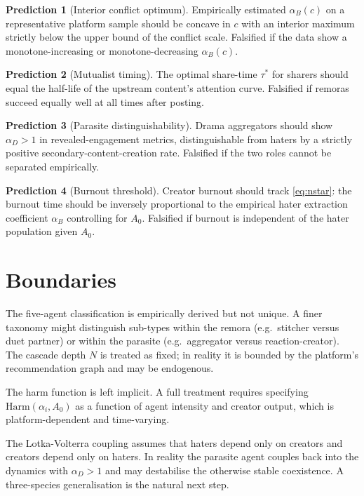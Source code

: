 \documentclass[12pt,a4paper]{article}
\begin{document}
\textbf{Prediction 1} (Interior conflict optimum). Empirically estimated $\alpha_B(c)$ on a representative platform sample should be concave in $c$ with an interior maximum strictly below the upper bound of the conflict scale. Falsified if the data show a monotone-increasing or monotone-decreasing $\alpha_B(c)$.

\textbf{Prediction 2} (Mutualist timing). The optimal share-time $\tau^{*}$ for sharers should equal the half-life of the upstream content's attention curve. Falsified if remoras succeed equally well at all times after posting.

\textbf{Prediction 3} (Parasite distinguishability). Drama aggregators should show $\alpha_D > 1$ in revealed-engagement metrics, distinguishable from haters by a strictly positive secondary-content-creation rate. Falsified if the two roles cannot be separated empirically.

\textbf{Prediction 4} (Burnout threshold). Creator burnout should track \eqref{eq:nstar}: the burnout time should be inversely proportional to the empirical hater extraction coefficient $\alpha_B$ controlling for $A_0$. Falsified if burnout is independent of the hater population given $A_0$.

\section{Boundaries}
\label{sec:boundaries}

The five-agent classification is empirically derived but not unique. A finer taxonomy might distinguish sub-types within the remora (e.g.\ stitcher versus duet partner) or within the parasite (e.g.\ aggregator versus reaction-creator). The cascade depth $N$ is treated as fixed; in reality it is bounded by the platform's recommendation graph and may be endogenous.

The harm function is left implicit. A full treatment requires specifying $\mathrm{Harm}(\alpha_i, A_0)$ as a function of agent intensity and creator output, which is platform-dependent and time-varying.

The Lotka-Volterra coupling assumes that haters depend only on creators and creators depend only on haters. In reality the parasite agent couples back into the dynamics with $\alpha_D > 1$ and may destabilise the otherwise stable coexistence. A three-species generalisation is the natural next step.
\end{document}
